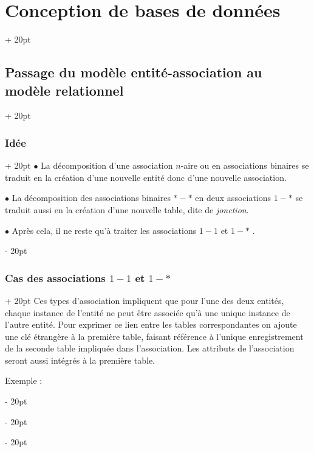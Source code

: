 \documentclass[a4paper, 12pt, twoside]{article}
\newcommand{\ind}[1][20pt]{\advance\leftskip + #1}
\newcommand{\deind}[1][20pt]{\advance\leftskip - #1}
\newenvironment{indt}[2][20pt]{#2 \par \ind[#1]}{\par \deind} %
\begin{document}
\begin{indt}{\section{Conception de bases de données}}
\begin{indt}{\subsection{Passage du modèle entité-association au modèle relationnel}}
\begin{indt}{\subsubsection{Idée}}
                $\bullet$ La décomposition d'une association $n$-aire ou en associations binaires se traduit en la création d'une nouvelle entité donc d'une nouvelle association.

                $\bullet$ La décomposition des associations binaires $*-*$ en deux associations $1-*$ se traduit aussi en la création d'une nouvelle table, dite de \textit{jonction}.

                $\bullet$ Après cela, il ne reste qu'à traiter les associations $1-1$  et $1-*$ .
            \end{indt}

            \vspace{12pt}
            
            \begin{indt}{\subsubsection{Cas des associations $1-1$ et $1-*$}}
                Ces types d'association impliquent que pour l'une des deux entités, chaque instance de l'entité ne peut être associée qu'à une unique instance de l'autre entité. Pour exprimer ce lien entre les tables correspondantes on ajoute une clé étrangère à la première table, faisant référence à l'unique enregistrement de la seconde table impliquée dans l'association. Les attributs de l'association seront aussi intégrés à la première table.


                Exemple :


\end{indt}
\end{indt}
\end{indt}
\end{document}

